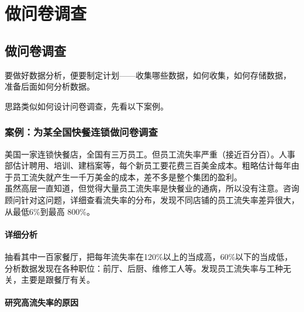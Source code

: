 
\chapter{做问卷调查} %

\hypertarget{ux505aux95eeux5377ux8c03ux67e5}{%
\section{做问卷调查}\label{ux505aux95eeux5377ux8c03ux67e5}}

要做好数据分析，便要制定计划------收集哪些数据，如何收集，如何存储数据，
准备后面如何分析数据。

思路类似如何设计问卷调查，先看以下案例。

\hypertarget{ux6848ux4f8bux4e3aux67d0ux5168ux56fdux5febux9910ux8fdeux9501ux505aux95eeux5377ux8c03ux67e5}{%
\subsection{案例：为某全国快餐连锁做问卷调查}\label{ux6848ux4f8bux4e3aux67d0ux5168ux56fdux5febux9910ux8fdeux9501ux505aux95eeux5377ux8c03ux67e5}}

美国一家连锁快餐店，全国有三万员工。但员工流失率严重（接近百分百）。人事部估计聘用、培训、建档案等，每个新员工要花费三百美金成本。粗略估计每年由于员工流失就产生一千万美金的成本，差不多是整个集团的盈利。\\
虽然高层一直知道，但觉得大量员工流失率是快餐业的通病，所以没有注意。咨询顾问针对这问题，详细查看流失率的分布，发现不同店铺的员工流失率差异很大，从最低6\%到最高
800\%。\\


\hypertarget{ux4eceux5206ux6790ux5230ux884cux52a8}{%
\subsubsection{详细分析}\label{ux4eceux5206ux6790ux5230ux884cux52a8}}

抽看其中一百家餐厅，把每年流失率在120\%以上的当成高，60\%以下的当成低，分析数据发现在各种职位：前厅、后厨、维修工人等。发现员工流失率与工种无关，主要是跟餐厅有关。\\

\hypertarget{ux4eceux5206ux6790ux5230ux884cux52a8}{%
\subsubsection{研究高流失率的原因}\label{ux4eceux5206ux6790ux5230ux884cux52a8}}

